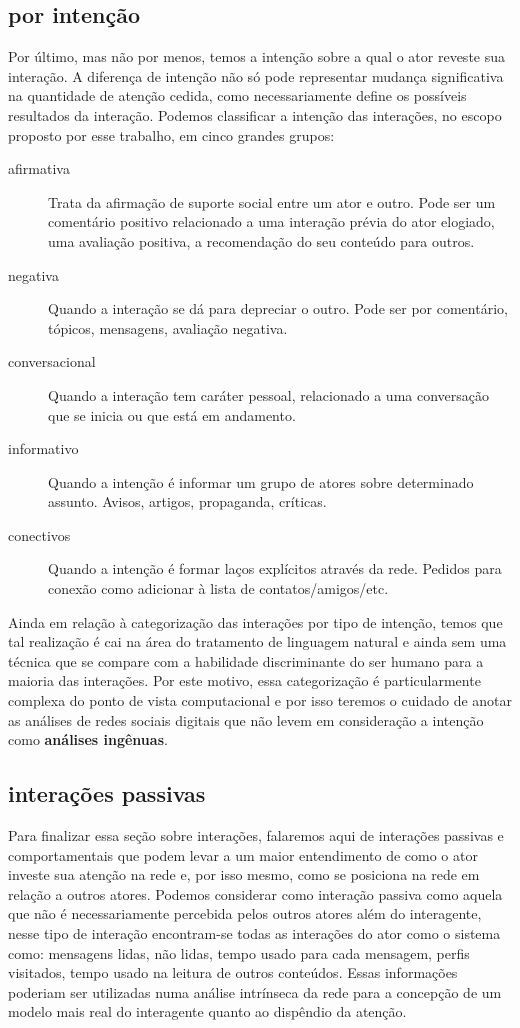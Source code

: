 \documentclass{article}
\begin{document}
\subsection{por intenção}
Por último, mas não por menos, temos a intenção sobre a qual o ator reveste sua
interação. A diferença de intenção não só pode representar mudança significativa
na quantidade de atenção cedida, como necessariamente define os possíveis
resultados da interação. Podemos classificar a intenção das interações, no
escopo proposto por esse trabalho, em cinco grandes grupos:
\begin{description}
\item[afirmativa] Trata da afirmação de suporte social entre um ator e outro.
Pode ser um comentário positivo relacionado a uma interação prévia do ator
elogiado, uma avaliação positiva, a recomendação do seu conteúdo para outros.
\item[negativa] Quando a interação se dá para depreciar o outro. Pode ser por
comentário, tópicos, mensagens, avaliação negativa.
\item[conversacional] Quando a interação tem caráter pessoal, relacionado a uma
conversação que se inicia ou que está em andamento.
\item[informativo] Quando a intenção é informar um grupo de atores sobre
determinado assunto. Avisos, artigos, propaganda, críticas.
\item[conectivos] Quando a intenção é formar laços explícitos através da rede.
Pedidos para conexão como adicionar à lista de contatos/amigos/etc.
\end{description}
Ainda em relação à categorização das interações por tipo de intenção, temos que
tal realização é cai na área do tratamento de linguagem natural e ainda sem uma
técnica que se compare com a habilidade discriminante do ser humano para a
maioria das interações. Por este motivo, essa categorização é particularmente
complexa do ponto de vista computacional e por isso teremos o cuidado de anotar
as análises de redes sociais digitais que não levem em consideração a intenção
como \textbf{análises ingênuas}.
\subsection{interações passivas}
Para finalizar essa seção sobre interações, falaremos aqui de interações
passivas e comportamentais que podem levar a um maior entendimento de como o
ator investe sua atenção na rede e, por isso mesmo, como se posiciona na rede em
relação a outros atores. Podemos considerar como interação passiva como
aquela que não é necessariamente percebida pelos outros atores além do
interagente, nesse tipo de interação encontram-se todas as interações do
ator como o sistema como: mensagens lidas, não lidas, tempo usado para
cada mensagem, perfis visitados, tempo usado na leitura de outros
conteúdos. Essas informações poderiam ser utilizadas numa análise
intrínseca da rede para a concepção de um modelo mais real do interagente
quanto ao dispêndio da atenção.
\end{document}
